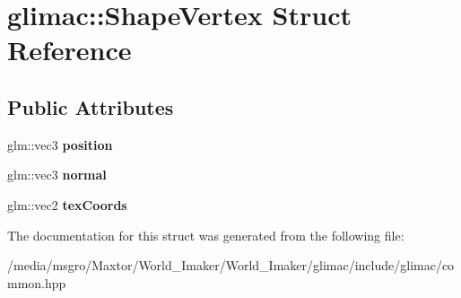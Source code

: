 \hypertarget{structglimac_1_1ShapeVertex}{}\section{glimac\+:\+:Shape\+Vertex Struct Reference}
\label{structglimac_1_1ShapeVertex}
\subsection*{Public Attributes}
\begin{DoxyCompactItemize}
\item 
\mbox{\label{structglimac_1_1ShapeVertex_a727bc4adace4f00e47069ce7373e3b97}} 
glm\+::vec3 {\bfseries position}
\item 
\mbox{\label{structglimac_1_1ShapeVertex_af8ef5c93da6bc86b5dcfa3d8e2a8fc21}} 
glm\+::vec3 {\bfseries normal}
\item 
\mbox{\label{structglimac_1_1ShapeVertex_ab694e76716c4cdc5e8636325b5fbeee2}} 
glm\+::vec2 {\bfseries tex\+Coords}
\end{DoxyCompactItemize}


The documentation for this struct was generated from the following file\+:\begin{DoxyCompactItemize}
\item 
/media/msgro/\+Maxtor/\+World\+\_\+\+Imaker/\+World\+\_\+\+Imaker/glimac/include/glimac/common.\+hpp\end{DoxyCompactItemize}
